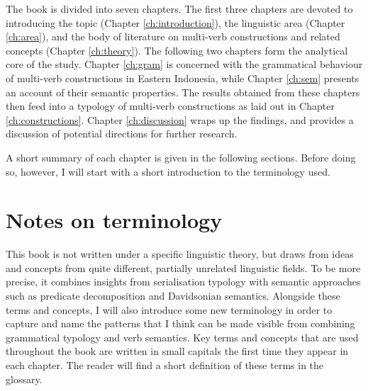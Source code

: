 The book is divided into seven chapters. The first three chapters are devoted to introducing the topic (Chapter \ref{ch:introduction}), the linguistic area (Chapter \ref{ch:area}), and the body of literature on multi-verb constructions and related concepts (Chapter \ref{ch:theory}). The following two chapters form the analytical core of the study. Chapter \ref{ch:gram} is concerned with the grammatical behaviour of multi-verb constructions in Eastern Indonesia, while Chapter \ref{ch:sem} presents an account of their semantic properties. The results obtained from these chapters then feed into a typology of multi-verb constructions as laid out in Chapter \ref{ch:constructions}. Chapter \ref{ch:discussion} wraps up the findings, and provides a discussion of potential directions for further research. 

A short summary of each chapter is given in the following sections. Before doing so, however, I will start with a short introduction to the terminology used.

\section*{Notes on terminology}

This book is not written under a specific linguistic theory, but draws from ideas and concepts from quite different, partially unrelated linguistic fields. To be more precise, it combines insights from serialisation typology with semantic approaches such as predicate decomposition and Davidsonian semantics. Alongside these terms and concepts, I will also introduce some new terminology in order to capture and name the patterns that I think can be made visible from combining grammatical typology and verb semantics. Key terms and concepts that are used throughout the book are written in small capitals the first time they appear in each chapter. The reader will find a short definition of these terms in the glossary.

